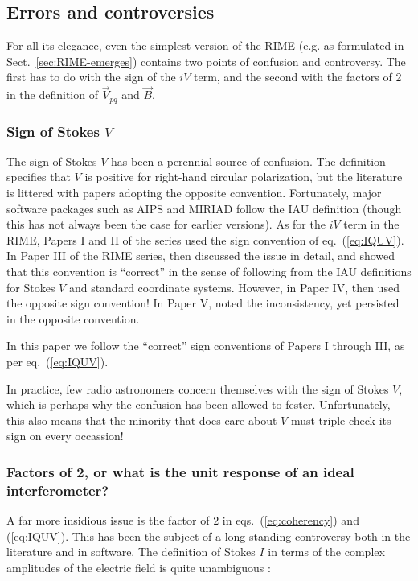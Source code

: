 \documentclass[]{aa}
\begin{document}
\subsection{Errors and controversies}

For all its elegance, even the simplest version of the RIME (e.g. as formulated in Sect.~\ref{sec:RIME-emerges}) contains two points of confusion and controversy. The first has to do with the sign of the $iV$ term, and the second with the factors of 2 in the definition of $\vec V_{pq}$ and $\vec B$.

\subsubsection{Sign of Stokes $V$}

The sign of Stokes $V$ has been a perennial source of confusion. The \citet{IAU74} definition specifies that $V$ is positive for right-hand circular polarization, but the literature is littered with papers adopting the opposite convention. Fortunately, major software packages such as AIPS and MIRIAD follow the IAU definition (though this 
has not always been the case for earlier versions). As for the $iV$ term in the RIME, Papers I and II of the series \citep{ME1,ME2} used the sign convention of eq.~(\ref{eq:IQUV}). In Paper III of the RIME series, \citet{ME3} then discussed the issue in detail, and showed that this convention is ``correct'' in the sense of following from the IAU definitions for Stokes $V$ and standard coordinate systems. However, in Paper IV, \citet{ME4} then used the opposite sign convention! In Paper V, \citet{ME5} noted the inconsistency, yet persisted in the opposite convention. 

In this paper we follow the ``correct'' sign conventions of Papers I through III, as per eq.~(\ref{eq:IQUV}).

In practice, few radio astronomers concern themselves with the sign of Stokes $V$, which is perhaps why the confusion has been allowed to fester. Unfortunately, this also means that the minority that does care about $V$ must triple-check its sign on every occassion!

\subsubsection{\label{sec:factor2}Factors of 2, or what is the unit response of an ideal interferometer?}

A far more insidious issue is the factor of $2$ in eqs.~(\ref{eq:coherency}) and (\ref{eq:IQUV}). This has been the subject of a long-standing controversy both in the literature and in software. The definition of Stokes $I$ in terms of the complex amplitudes of the electric field is quite unambiguous \citep{tms,born-wolf}:
\end{document}
